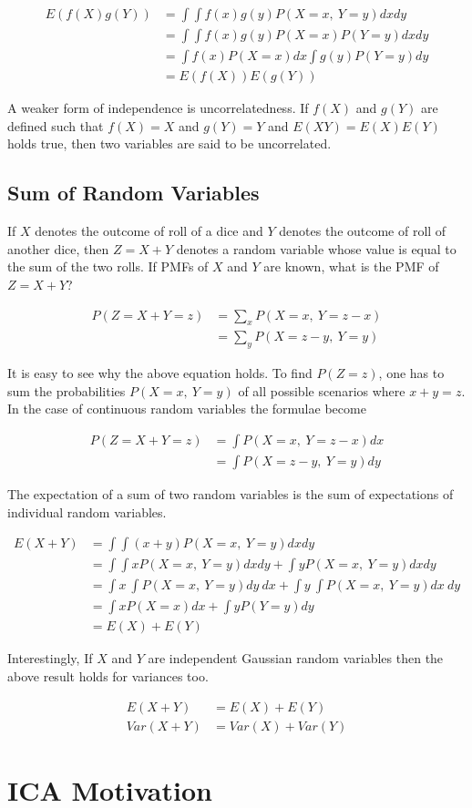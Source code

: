 \documentclass[11pt, a4paper]{article}
\begin{document}
\begin{align*}
	E(f(X)g(Y)) & = \int \int f(x)g(y)P(X=x,\ Y=y)dxdy      \\ 
	            & = \int \int f(x)g(y) P(X=x) P(Y=y) dxdy   \\
	            & = \int f(x) P(X=x) dx \int g(y) P(Y=y) dy \\
	            & = E(f(X))E(g(Y))                          
\end{align*}

A weaker form of independence is uncorrelatedness. If $f(X)$ and $g(Y)$ are defined such that $f(X)=X$ and $g(Y) = Y$ and $E(XY) = E(X)E(Y)$ holds true, then two variables are said to be uncorrelated.

\subsection {Sum of Random Variables}

If $X$ denotes the outcome of roll of a dice and $Y$ denotes the outcome of roll of another dice, then $Z=X+Y$ denotes a random variable whose value is equal to the sum of the two rolls. If PMFs of $X$ and $Y$ are known, what is the PMF of $Z=X+Y$?

\begin{align*}
	P(Z=X+Y=z) & = \sum_x P(X=x,\ Y=z-x) \\
	           & = \sum_y P(X=z-y,\ Y=y) 
\end{align*}

It is easy to see why the above equation holds. To find $P(Z=z)$, one has to sum the probabilities $P(X=x,\ Y=y)$ of all possible scenarios where $x+y=z$. In the case of continuous random variables the formulae become

\begin{align*}
	P(Z=X+Y=z) & = \int P(X=x,\ Y=z-x) dx \\
	           & = \int P(X=z-y,\ Y=y) dy 
\end{align*}

The expectation of a sum of two random variables is the sum of expectations of individual random variables.

\begin{align*}
	E(X+Y) & = \int \int (x+y)P(X=x,\ Y=y)dxdy                                     \\
	       & = \int \int xP(X=x,\ Y=y)dxdy + \int yP(X=x,\ Y=y)dxdy                \\
	       & = \int x\ \int P(X=x,\ Y=y) dy\ dx + \int y\ \int P(X=x,\ Y=y) dx\ dy \\
	       & = \int xP(X=x)dx + \int yP(Y=y)dy                                     \\
	       & = E(X) + E(Y)                                                         
\end{align*}

Interestingly, If $X$ and $Y$ are independent Gaussian random variables then the above result holds for variances too.

\begin{align*}
	E(X+Y)   & = E(X) + E(Y)     \\
	Var(X+Y) & = Var(X) + Var(Y) 
\end{align*}

\section{ICA Motivation}
\end{document}
